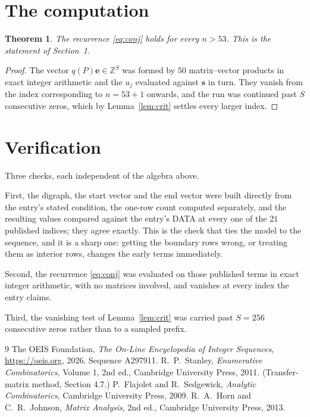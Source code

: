 \documentclass[11pt,a4paper]{article}
\theoremstyle{plain}
\newtheorem{theorem}{Theorem}
\theoremstyle{definition}
\begin{document}
\section{The computation}

\begin{theorem}
The recurrence \eqref{eq:conj} holds for every $n>53$. This is the statement of
Section~1.
\end{theorem}

\begin{proof}
The vector $q(P)\mathbf{e}\in\mathbb{Z}^{S}$ was formed by $50$ matrix--vector
products in exact integer arithmetic and the $u_j$ evaluated against $\mathbf{s}$ in turn.
They vanish from the index corresponding to $n=53+1$ onwards, and the run was continued
past $S$ consecutive zeros, which by Lemma~\ref{lem:crit} settles every larger index.
\end{proof}

\section{Verification}

Three checks, each independent of the algebra above.

First, the digraph, the start vector and the end vector were built directly from the
entry's stated condition, the one-row count computed separately, and the resulting values
compared against the entry's DATA at every one of the $21$ published indices; they
agree exactly. This is the check that ties the model to the sequence, and it is a sharp one:
getting the boundary rows wrong, or treating them as interior rows, changes the early terms
immediately.

Second, the recurrence \eqref{eq:conj} was evaluated on those published terms in exact
integer arithmetic, with no matrices involved, and vanishes at every index the entry claims.

Third, the vanishing test of Lemma~\ref{lem:crit} was carried past $S=256$ consecutive
zeros rather than to a sampled prefix.

\begin{thebibliography}{9}
 The OEIS Foundation, \emph{The On-Line Encyclopedia of Integer
Sequences}, \url{https://oeis.org}, 2026. Sequence A297911.
 R.~P.~Stanley, \emph{Enumerative Combinatorics}, Volume 1, 2nd ed.,
Cambridge University Press, 2011. (Transfer-matrix method, Section 4.7.)
 P.~Flajolet and R.~Sedgewick, \emph{Analytic Combinatorics}, Cambridge
University Press, 2009.
 R.~A.~Horn and C.~R.~Johnson, \emph{Matrix Analysis}, 2nd ed., Cambridge
University Press, 2013.
\end{thebibliography}
\end{document}
